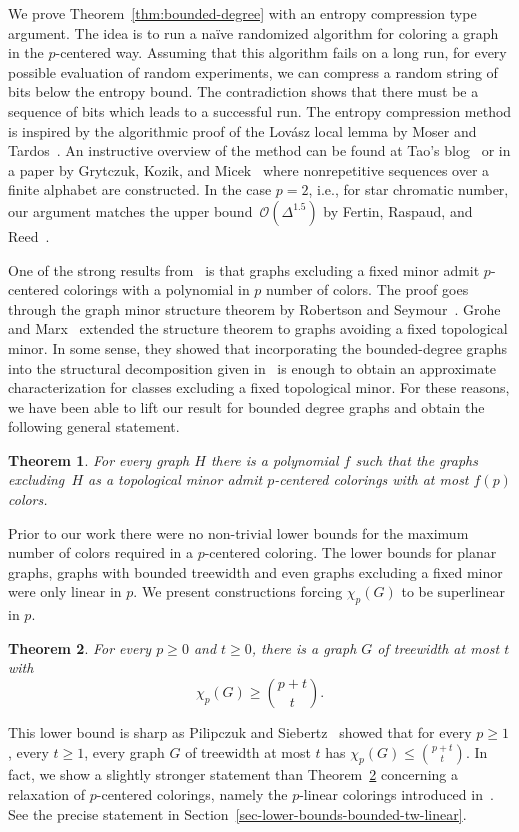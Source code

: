 \documentclass[11pt]{article}
\newtheorem{theorem}{Theorem}
\begin{document}
We prove Theorem~\ref{thm:bounded-degree} with an entropy compression type
argument.  The idea is to run a naïve randomized algorithm for coloring a
graph in the $p$-centered way.  Assuming that this algorithm fails on a long
run, for every possible evaluation of random experiments, we can compress a
random string of bits below the entropy bound. The contradiction shows that
there must be a sequence of bits which leads to a successful run.  The entropy
compression method is inspired by the algorithmic proof of the Lovász local
lemma by Moser and Tardos~\cite{MT10}.  An instructive overview of the method
can be found at Tao's blog~\cite{Tao09} or in a paper by Grytczuk, Kozik, and
Micek~\cite{GKM13} where nonrepetitive sequences over a finite alphabet are
constructed.  In the case $p=2$, i.e., for star chromatic number, our argument
matches the upper bound~$\mathcal{O}(\Delta^{1.5})$ by Fertin, Raspaud, and
Reed~\cite{FRR04}.

One of the strong results from~\cite{PS19} is that graphs excluding a fixed minor 
admit $p$-centered colorings with a polynomial in $p$ number of colors. 
The proof goes through the graph minor structure theorem by Robertson and Seymour~\cite{RS03}.
Grohe and Marx~\cite{GM15} extended the structure theorem to graphs avoiding a fixed topological minor.
In some sense, they showed that incorporating the bounded-degree graphs into the structural decomposition 
given in~\cite{RS03} is enough to obtain an approximate characterization for 
classes excluding a fixed topological minor.
For these reasons, we have been able to lift our result for bounded degree graphs and 
obtain the following general statement.

\begin{theorem}\label{thm:topological-minors-sugar}
For every graph $H$ there is a polynomial $f$ such that 
the graphs excluding~$H$ as a topological minor admit $p$-centered
colorings with at most $f(p)$ colors.
\end{theorem}


Prior to our work there were no non-trivial lower bounds for the maximum number of 
colors required in a $p$-centered coloring.
The lower bounds for planar graphs, graphs with bounded treewidth and even 
graphs excluding a fixed minor were only linear in $p$.
We present constructions forcing $\chi_p(G)$ to be superlinear in $p$.
\begin{theorem}\label{thm:tw-lower-bound}
For every $p\geq0$ and $t\geq 0$, there is a graph $G$ of treewidth at most $t$ with
\[
\chi_p(G) \geq \textstyle \binom{p+t}{t}.
\]
\end{theorem}
This lower bound is sharp as Pilipczuk and Siebertz~\cite{PS19} showed 
that for every $p\geq1$, every $t\geq1$,
every graph $G$ of treewidth at most $t$ has $\chi_p(G)\leq \binom{p+t}{t}$.
In fact, we show a slightly stronger statement than Theorem~\ref{thm:tw-lower-bound} 
concerning a relaxation of $p$-centered colorings, 
namely the $p$-linear colorings introduced in~\cite{KBPS18}.
See the precise statement in Section~\ref{sec-lower-bounds-bounded-tw-linear}.
\end{document}
